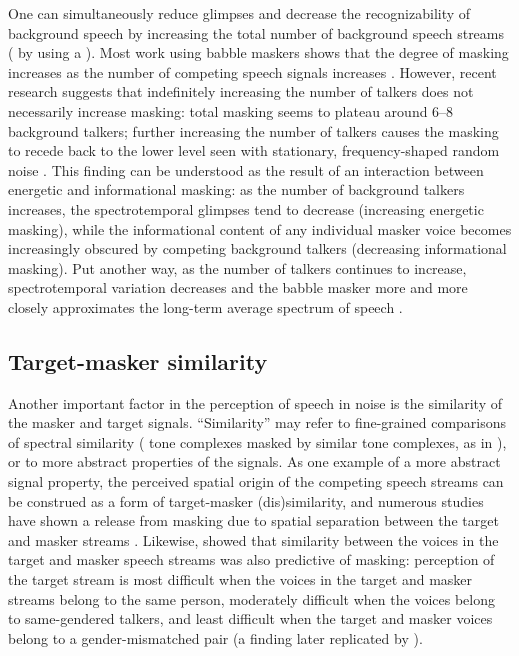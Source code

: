 One can simultaneously reduce glimpses and decrease the recognizability of background speech by increasing the total number of background speech streams (\ie{} by using a ).  Most work using babble maskers shows that the degree of masking increases as the number of competing speech signals increases \citep[\eg][]{Miller1947, BrungartEtAl2001}.  However, recent research suggests that indefinitely increasing the number of talkers does not necessarily increase masking: total masking seems to plateau around 6–8 background talkers; further increasing the number of talkers causes the masking to recede back to the lower level seen with stationary, frequency-shaped random noise \citep{SimpsonCooke2005}.  This finding can be understood as the result of an interaction between energetic and informational masking: as the number of background talkers increases, the spectrotemporal glimpses tend to decrease (increasing energetic masking), while the informational content of any individual masker voice becomes increasingly obscured by competing background talkers (decreasing informational masking).  Put another way, as the number of talkers continues to increase, spectrotemporal variation decreases and the babble masker more and more closely approximates the long-term average spectrum of speech \citep{SimpsonCooke2005}.

\subsection{Target-masker similarity\label{sec:Similarity}}
Another important factor in the perception of speech in noise is the similarity of the masker and target signals.  “Similarity” may refer to fine-grained comparisons of spectral similarity (\eg{} tone complexes masked by similar tone complexes, as in \citealt{LeeRichards2011}), or to more abstract properties of the signals.\footnotemark{}  As one example of a more abstract signal property, the perceived spatial origin of the competing speech streams can be construed as a form of target-masker {(dis)similarity}, and numerous studies have shown a release from masking due to spatial separation between the target and masker streams \citep[\eg][]{FreymanEtAl1999, BrungartSimpson2002, FreymanEtAl2004, GallunEtAl2005, KiddEtAl2005a, JohnstoneLitovsky2006}.  Likewise, \citet{Brungart2001} showed that similarity between the voices in the target and masker speech streams was also predictive of masking: perception of the target stream is most difficult when the voices in the target and masker streams belong to the same person, moderately difficult when the voices belong to same-gendered talkers, and least difficult when the target and masker voices belong to a gender-mismatched pair (a finding later replicated by \citealt{HelferFreyman2008}).

